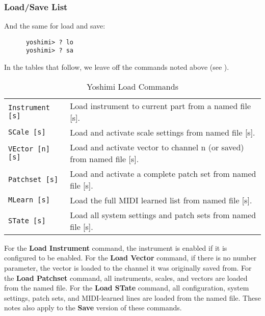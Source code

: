 \subsubsection{Load/Save List}
\label{subsec:command_line_loadsave_list}

   And the same for load and save:

   \begin{verbatim}
      yoshimi> ? lo
      yoshimi> ? sa
   \end{verbatim}

   In the tables that follow, we leave off the commands noted above
   (see ).

   \begin{table}[H]
      \centering
      \caption{Yoshimi Load Commands}
      \label{table:yoshimi_text_load_commands}
      \begin{tabular}{l l}

\texttt{Instrument [s]} &
   Load instrument to current part from a named file [s]. \\
\texttt{SCale [s]} &
   Load and activate scale settings from named file [s]. \\
\texttt{VEctor [n] [s]} &
   Load and activate vector to channel n (or saved) from named file [s]. \\
\texttt{Patchset [s]} &
   Load and activate a complete patch set from named file [s]. \\
\texttt{MLearn [s]} &
   Load the full MIDI learned list from named file [s]. \\
\texttt{STate [s]} &
   Load all system settings and patch sets from named file [s]. \\

      \end{tabular}
   \end{table}

   For the \textbf{Load Instrument} command, the instrument is enabled if it is
   configured to be enabled.  For the \textbf{Load Vector} command, if there is
   no number parameter, the vector is loaded to the channel it was originally
   saved from.
   For the \textbf{Load Patchset} command, all instruments, scales, and vectors
   are loaded from the named file.
   For the \textbf{Load STate} command, all configuration, system settings,
   patch sets, and MIDI-learned lines are loaded from the named file.
   These notes also apply to the \textbf{Save} version of these commands.

